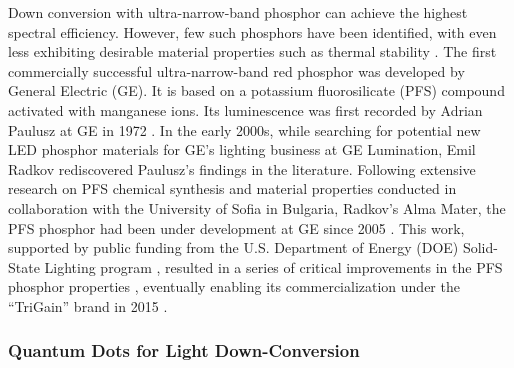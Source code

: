 \documentclass[10pt]{article}
\begin{document}
Down conversion with ultra-narrow-band phosphor can achieve the highest spectral efficiency. However, few such phosphors have been identified, with even less exhibiting desirable material properties such as thermal stability \cite{Phillips2007}. The first commercially successful ultra-narrow-band red phosphor was developed by General Electric (GE). It is based on a potassium fluorosilicate (PFS) compound activated with manganese ions. Its luminescence was first recorded by Adrian Paulusz at GE in 1972 \cite{paulusz1973efficient}. In the early 2000s, while searching for potential new LED phosphor materials for GE’s lighting business at GE Lumination, Emil Radkov rediscovered Paulusz’s findings in the literature. Following extensive research on PFS chemical synthesis and material properties conducted in collaboration with the University of Sofia in Bulgaria, Radkov’s Alma Mater, the PFS phosphor had been under development at GE since 2005 \cite{radkov2006red}\cite{radkov2009red}. This work, supported by public funding from the U.S. Department of Energy (DOE) Solid-State Lighting program \cite{doesslprogram}, resulted in a series of critical improvements in the PFS phosphor properties \cite{Setlur2010}\cite{lyons2012color}, eventually enabling its commercialization under the “TriGain” brand in 2015 \cite{trigain_spectrum}\cite{setlur2015trigain}\cite{Murphy2015}.

\subsubsection{Quantum Dots for Light Down-Conversion}
\end{document}
